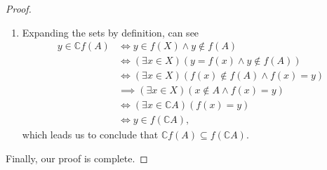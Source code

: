 \documentclass[12pt,a4paper]{article}
\theoremstyle{theorem}
\theoremstyle{definition}
\begin{document}
\begin{proof}
\begin{enumerate}
\item Expanding the sets by definition,  can see
\begin{align*}
y \in \mathbb{C} f(A) &\iff y \in f(X) \land y \not \in f(A) \\
&\iff (\exists x \in X)(y = f(x) \land y \not \in f(A))\\
&\iff (\exists x \in X)(f(x) \not \in f(A) \land f(x) = y)\\
&\implies (\exists x \in X)(x \not \in A \land f(x) = y)\\
&\iff (\exists x \in \mathbb{C}A)(f(x) = y)\\
&\iff y \in f(\mathbb{C}A) \text{,}
\end{align*}
which leads us to conclude that $\mathbb{C} f(A) \subseteq f(\mathbb{C}A)$.
\end{enumerate}
Finally,  our proof is complete.
\end{proof}
\end{document}

